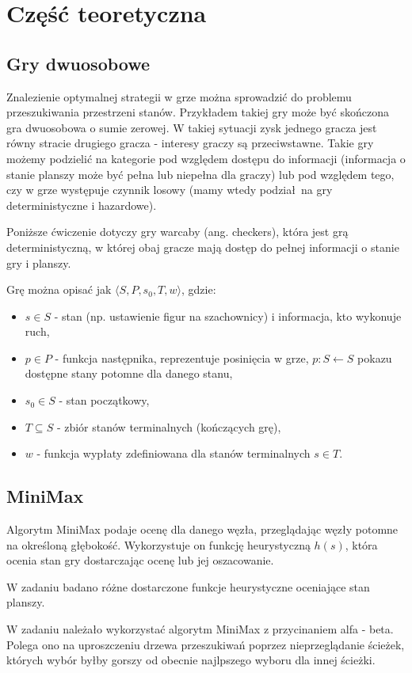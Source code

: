 
\section{Część teoretyczna}
\subsection{Gry dwuosobowe}
Znalezienie optymalnej strategii w grze można sprowadzić do problemu
przeszukiwania przestrzeni stanów. Przykładem takiej gry może być skończona
gra dwuosobowa o sumie zerowej. W takiej sytuacji zysk jednego gracza jest
równy stracie drugiego gracza - interesy graczy są przeciwstawne. Takie gry
możemy podzielić na kategorie pod względem dostępu do informacji (informacja
o stanie planszy może być pełna lub niepełna dla graczy) lub pod względem tego,
czy w grze występuje czynnik losowy (mamy wtedy podział na gry deterministyczne
i hazardowe).

Poniższe ćwiczenie dotyczy gry warcaby (ang. checkers), która jest grą
deterministyczną, w której obaj gracze mają dostęp do pełnej informacji o
stanie gry i planszy.

Grę można opisać jak $\langle S,P,s_0, T, w \rangle$, gdzie:
\begin{itemize}
  \item $s \in S$ - stan (np. ustawienie figur na szachownicy) i informacja,
    kto wykonuje ruch,
  \item $p \in P$ - funkcja następnika, reprezentuje posinięcia w grze,
    $p:S \leftarrow S$ pokazu dostępne stany potomne dla danego stanu,
  \item $s_0 \in S$ - stan początkowy,
  \item $T \subseteq S$ - zbiór stanów terminalnych (kończących grę),
  \item $w$ - funkcja wypłaty zdefiniowana dla stanów terminalnych $s \in T$.
\end{itemize}

\subsection{MiniMax}
Algorytm MiniMax podaje ocenę dla danego węzła, przeglądając węzły potomne
na określoną głębokość. Wykorzystuje on funkcję heurystyczną $h(s)$, która
ocenia stan gry dostarczając ocenę lub jej oszacowanie.

W zadaniu badano różne dostarczone funkcje heurystyczne oceniające stan
planszy.

W zadaniu należało wykorzystać algorytm MiniMax z przycinaniem alfa - beta.
Polega ono na uproszczeniu drzewa przeszukiwań poprzez nieprzeglądanie ścieżek,
których wybór byłby gorszy od obecnie najlpszego wyboru dla innej ścieżki.

